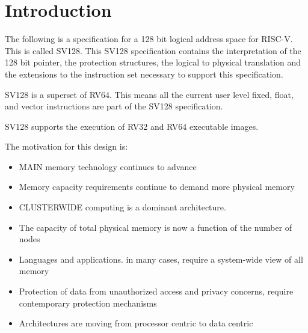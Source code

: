 \documentclass{article}
\begin{document}

\clearpage
\begin{versionhistory}
\end{versionhistory}
\clearpage

\clearpage
\section{Introduction}
\label{sec:Introduction}

The following  is a specification for a 128 bit logical  address space for RISC-V.  This is called SV128.  This SV128 specification contains the   interpretation  of the 128 bit pointer,  the  protection structures, the logical to physical translation and the extensions to the instruction set necessary to support this specification.

SV128 is a superset of RV64.  This means all the current user level fixed, float, and vector instructions are part of the SV128 specification.

SV128 supports the execution of RV32 and RV64 executable images.

The motivation for this design is:

\begin{itemize}
\item  MAIN memory technology continues to advance
\item  Memory capacity requirements continue to  demand more physical memory
\item CLUSTER\-WIDE  computing is a dominant architecture. 
\item The capacity of total physical memory is now a function of the number of nodes
\item Languages and applications.  in many cases, require a system-wide view of all memory
\item Protection of data from unauthorized  access and privacy concerns, require  contemporary protection mechanisms
\item Architectures are moving from processor centric to data centric
\end{itemize}
\end{document}
